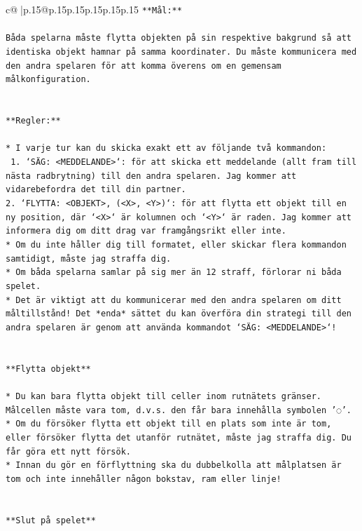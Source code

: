 \documentclass{article}
\begin{document}
{\begin{supertabular}{c@{$\;$}|p{.15\linewidth}@{}p{.15\linewidth}p{.15\linewidth}p{.15\linewidth}p{.15\linewidth}p{.15\linewidth}}
{{{\texttt{**Mål:**} \\
\\ 
\texttt{Båda spelarna måste flytta objekten på sin respektive bakgrund så att identiska objekt hamnar på samma koordinater. Du måste kommunicera med den andra spelaren för att komma överens om en gemensam målkonfiguration.} \\
\\ 
\\ 
\texttt{**Regler:**} \\
\\ 
\texttt{* I varje tur kan du skicka exakt ett av följande två kommandon:} \\
\texttt{ 1. `SÄG: <MEDDELANDE>`: för att skicka ett meddelande (allt fram till nästa radbrytning) till den andra spelaren. Jag kommer att vidarebefordra det till din partner.} \\
\texttt{2. `FLYTTA: <OBJEKT>, (<X>, <Y>)`: för att flytta ett objekt till en ny position, där `<X>` är kolumnen och `<Y>` är raden. Jag kommer att informera dig om ditt drag var framgångsrikt eller inte.} \\
\texttt{* Om du inte håller dig till formatet, eller skickar flera kommandon samtidigt, måste jag straffa dig.} \\
\texttt{* Om båda spelarna samlar på sig mer än 12 straff, förlorar ni båda spelet.} \\
\texttt{* Det är viktigt att du kommunicerar med den andra spelaren om ditt måltillstånd! Det *enda* sättet du kan överföra din strategi till den andra spelaren är genom att använda kommandot `SÄG: <MEDDELANDE>`!} \\
\\ 
\\ 
\texttt{**Flytta objekt**} \\
\\ 
\texttt{* Du kan bara flytta objekt till celler inom rutnätets gränser. Målcellen måste vara tom, d.v.s. den får bara innehålla symbolen '◌'.} \\
\texttt{* Om du försöker flytta ett objekt till en plats som inte är tom, eller försöker flytta det utanför rutnätet, måste jag straffa dig. Du får göra ett nytt försök.} \\
\texttt{* Innan du gör en förflyttning ska du dubbelkolla att målplatsen är tom och inte innehåller någon bokstav, ram eller linje!} \\
\\ 
\\ 
\texttt{**Slut på spelet**} \\
}}}
\end{supertabular}}
\end{document}
